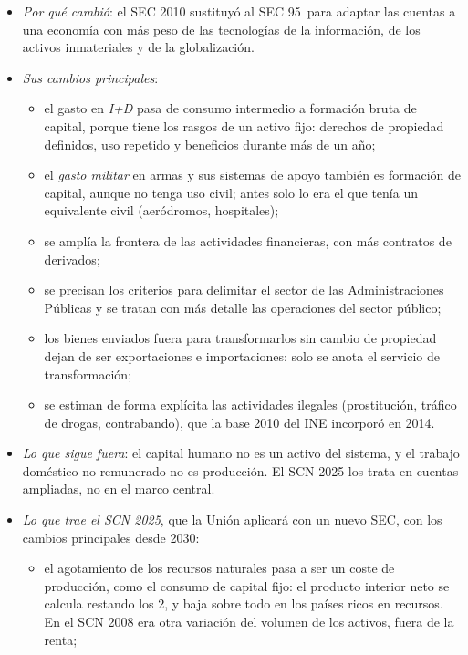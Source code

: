 \documentclass[11pt]{article}
\begin{document}
\begin{itemize}
\item \emph{Por qué cambió}: el SEC 2010 sustituyó al SEC 95~para adaptar las cuentas a una economía con más peso de las tecnologías de la información, de los activos inmateriales y de la globalización\nocite{IGAE2014SEC2010,MurielDeLaRiva2015}.
\item \emph{Sus cambios principales}\nocite{INE2014Base2010}:
  \begin{itemize}
  \item el gasto en \emph{I+D} pasa de consumo intermedio a formación bruta de capital, porque tiene los rasgos de un activo fijo: derechos de propiedad definidos, uso repetido y beneficios durante más de un año;
  \item el \emph{gasto militar} en armas y sus sistemas de apoyo también es formación de capital, aunque no tenga uso civil; antes solo lo era el que tenía un equivalente civil (aeródromos, hospitales);
  \item se amplía la frontera de las actividades financieras, con más contratos de derivados;
  \item se precisan los criterios para delimitar el sector de las Administraciones Públicas y se tratan con más detalle las operaciones del sector público;
  \item los bienes enviados fuera para transformarlos sin cambio de propiedad dejan de ser exportaciones e importaciones: solo se anota el servicio de transformación;
  \item se estiman de forma explícita las actividades ilegales (prostitución, tráfico de drogas, contrabando), que la base 2010 del INE incorporó en 2014.
  \end{itemize}
\item \emph{Lo que sigue fuera}: el capital humano no es un activo del sistema, y el trabajo doméstico no remunerado no es producción. El SCN 2025 los trata en cuentas ampliadas, no en el marco central\nocite{ONU2025SCN}.
\item \emph{Lo que trae el SCN 2025}, que la Unión aplicará con un nuevo SEC, con los cambios principales desde 2030\nocite{Eurostat2026ESA2030,Verrinder2026SCN2025}:
  \begin{itemize}
  \item el agotamiento de los recursos naturales pasa a ser un coste de producción, como el consumo de capital fijo: el producto interior neto se calcula restando los 2, y baja sobre todo en los países ricos en recursos. En el SCN 2008 era otra variación del volumen de los activos, fuera de la renta\nocite{Harper2025SNA};

\end{itemize}
\end{itemize}
\end{document}
